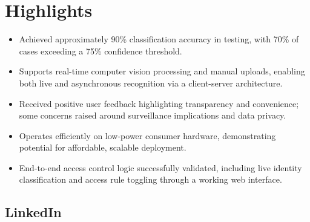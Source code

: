 \documentclass[a4paper,10pt]{article}
\begin{document}
\noindent\begin{minipage}[t]{0.65\textwidth}\vspace{0pt}
    \small
    \section*{Highlights}
    \begin{itemize}
        \item Achieved approximately 90\% classification accuracy in testing, with 70\% of cases exceeding a 75\% confidence threshold.
        \item Supports real-time computer vision processing and manual uploads, enabling both live and asynchronous recognition via a client-server architecture.
        \item Received positive user feedback highlighting transparency and convenience; some concerns raised around surveillance implications and data privacy.
        \item Operates efficiently on low-power consumer hardware, demonstrating potential for affordable, scalable deployment.
        \item End-to-end access control logic successfully validated, including live identity classification and access rule toggling through a working web interface.
    \end{itemize}
\end{minipage}%
\hfill
\begin{minipage}[t]{0.3\textwidth}\vspace{0pt}
    \begin{center}
        \section*{LinkedIn}
    \end{center}
\end{minipage}
\end{document}
